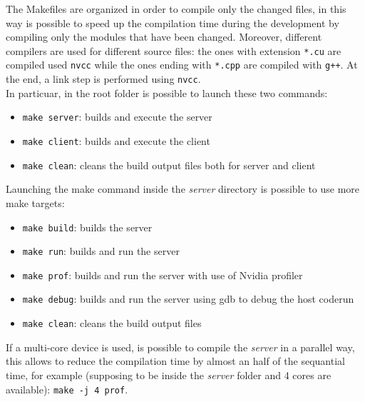 \documentclass[paper=a4, fontsize=10pt]{scrartcl}	%
\begin{document}
	The Makefiles are organized in order to compile only the changed files, in this way is possible to speed up the compilation time during the development by compiling only the modules that have been changed. Moreover, different compilers are used for different source files: the ones with extension \texttt{*.cu} are compiled used \texttt{nvcc} while the ones ending with \texttt{*.cpp} are compiled with \texttt{g++}. At the end, a link step is performed using \texttt{nvcc}.\\
	
	In particuar, in the root folder is possible to launch these two commands:

	\begin{itemize}
		\itemsep 0sp
		\item \texttt{make server}: builds and execute the server
		\item \texttt{make client}: builds and execute the client
		\item \texttt{make clean}: cleans the build output files both for server and client
	\end{itemize}

	Launching the make command inside the \textit{server} directory is possible to use more make targets:

	\begin{itemize}
		\itemsep 0sp
		\item \texttt{make build}: builds the server
		\item \texttt{make run}: builds and run the server
		\item \texttt{make prof}: builds and run the server with use of Nvidia profiler
		\item \texttt{make debug}: builds and run the server using gdb to debug the host coderun
		\item \texttt{make clean}: cleans the build output files
	\end{itemize}

	If a multi-core device is used, is possible to compile the \textit{server} in a parallel way, this allows to reduce the compilation time by almost an half of the sequantial time, for example (supposing to be inside the \textit{server} folder and 4 cores are available): \texttt{make -j 4 prof}.\\
\end{document}
